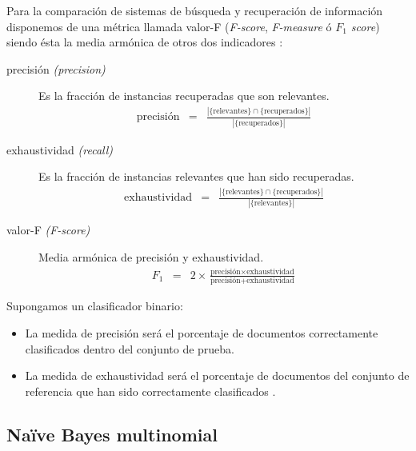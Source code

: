Para la comparación de sistemas de búsqueda y recuperación de información disponemos de una métrica llamada valor-F (\emph{F-score}, \emph{F-measure} ó \emph{$F_1$ score}) siendo ésta la media armónica de otros dos indicadores \citep[Precisión y exhaustividad]{wikipedia-es}:
\begin{description}
\item[precisión \emph{(precision)}] 
Es la fracción de instancias recuperadas que son relevantes.
\begin{eqnarray}
\text{precisión} &=& \frac{|\{\text{relevantes}\}\cap\{\text{recuperados}\}|}{|\{\text{recuperados}\}|}
\end{eqnarray}
\item[exhaustividad \emph{(recall)}] 
Es la fracción de instancias relevantes que han sido recuperadas.
\begin{eqnarray}
\text{exhaustividad} &=& \frac{|\{\text{relevantes}\}\cap\{\text{recuperados}\}|}{|\{\text{relevantes}\}|}
\end{eqnarray}
\item[valor-F \emph{(F-score)}] Media armónica de precisión y exhaustividad.
\begin{eqnarray}
F_1 &=& 2\times\frac{\text{precisión}\times\text{exhaustividad}}{\text{precisión}+\text{exhaustividad}}
\end{eqnarray}
\end{description}

Supongamos un clasificador binario:
\begin{itemize}
\item La medida de precisión será el porcentaje de documentos correctamente clasificados dentro del conjunto de prueba.
\item La medida de exhaustividad será el porcentaje de documentos del conjunto de referencia que han sido correctamente clasificados \citep{Perkins2010}.
\end{itemize}

\subsection{Naïve Bayes multinomial}

